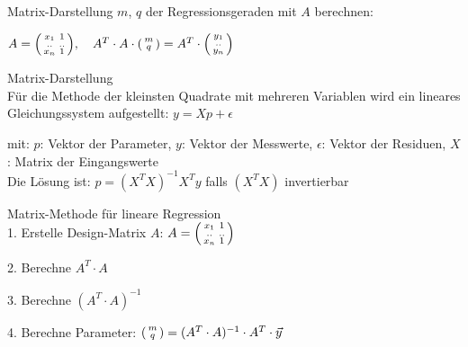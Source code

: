 \begin{definition}{Matrix-Darstellung}
$m$, $q$ der Regressionsgeraden mit $A$ berechnen:

$A = \begin{psmallmatrix} x_1 & 1 \\ .. & .. \\ x_n & 1 \end{psmallmatrix}, \quad A^T \cdot A \cdot \begin{psmallmatrix} m \\ q \end{psmallmatrix} = A^T \cdot \begin{psmallmatrix} y_1 \\ .. \\ y_n \end{psmallmatrix}$
\end{definition}

\begin{concept}{Matrix-Darstellung}\\
Für die Methode der kleinsten Quadrate mit mehreren Variablen wird ein lineares Gleichungssystem aufgestellt:
$y = Xp + \epsilon$

mit:
$p$: Vektor der Parameter,
$y$: Vektor der Messwerte,
$\epsilon$: Vektor der Residuen,
$X$: Matrix der Eingangswerte
\vspace{1mm}\\
Die Lösung ist:
$p = (X^TX)^{-1}X^Ty$
falls $(X^TX)$ invertierbar
\end{concept}



\begin{KR}{Matrix-Methode für lineare Regression}\\
1. Erstelle Design-Matrix $A$:
   $A = \begin{psmallmatrix} x_1 & 1 \\ .. & .. \\ x_n & 1 \end{psmallmatrix}$

2. Berechne $A^T \cdot A$

3. Berechne $(A^T \cdot A)^{-1}$

4. Berechne Parameter:
   $\begin{psmallmatrix} m \\ q \end{psmallmatrix} = (A^T \cdot A)^{-1} \cdot A^T \cdot \vec{y}$
\end{KR}



